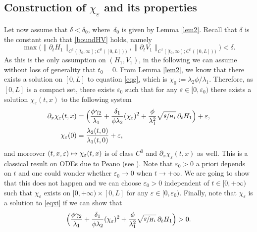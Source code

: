 \documentclass[JEP,XML,SOM,Unicode]{cedram}
\newcommand\mto{\mathchoice{\longmapsto}{\mapsto}{\mapsto}{\mapsto}}
\theoremstyle{definition}
\begin{document}
\subsection{Construction of $\chi_{\varepsilon}$ and its properties}
Let now assume that $\delta \!<\!\delta_{0}$, where~$\delta_{0}$ is given by Lemma \ref{lem2}. {Recall that $\delta$ is the constant such that \eqref{boundHV} holds, namely
\begin{equation*}
\max\bigl(\lVert\partial_{t}H_{1}\rVert_{C^{1}([t_{0},\infty);{C^{0}([0,L])})},\lVert\partial_{t}V_{1}\rVert_{C^{1}([t_{0},\infty);{C^{0}([0,L])})}\bigr)<\delta.
\end{equation*}
As this is the only assumption on $(H_{1},V_{1})$, in the following we can assume without loss of generality that $t_{0}=0$.}
From Lemma \ref{lem2}, we know that there exists a solution on $[0,L]$ to equation \eqref{eqg}, which is ${\chi_{0}:=}\lambda_{2}\phi/\lambda_{1}$.
Therefore, as $[0,L]$ is a compact set, there exists $\varepsilon_{{0}}$ such that
for any $\varepsilon\in[0,\varepsilon_{{0}})$ there exists a solution $\chi_{\varepsilon}(t,x)$ to the following system
\begin{equation}
\begin{split}
\partial_{x}\chi_{\varepsilon}(t,x)&=\Bigl(\frac{\phi\gamma_{2}}{\lambda_{1}}+\frac{\delta_{1}}{\phi\lambda_{2}}(\chi_{\varepsilon})^{2}+{\frac{\phi}{\lambda_{1}^{2}}}\sqrt{\sfrac{g}{H_{1}}}\,\partial_{t} H_{1} \Bigr)+\varepsilon,\\
\chi_{\varepsilon}(0)&=\frac{\lambda_{2}(t,0)}{\lambda_{1}(t,0)}+\varepsilon,
\end{split}
\label{eqf}
\end{equation}
and moreover $(t,x,\varepsilon)\mto \chi_{\varepsilon}(t,x)$ is of class $C^{0}$ and $\partial_{x}\chi_{\varepsilon}(t,x)$ as well.
This is a classical result on {ODEs} due to Peano (see \eg \cite[Chap.\,5, Th.\,3.1]{Hartman}). Note that $\varepsilon_{0}>0$ a priori depends on $t$ and one could wonder whether $\varepsilon_{0}\to 0$ when $t\to+\infty$. We are going to show that this does not happen and we can choose $\varepsilon_{0}>0$ independent of $t\in[0,+\infty)$ such that $\chi_{\varepsilon}$ exists on $[0,+\infty)\times[0,L]$ for any $\varepsilon\in[0,\varepsilon_{0})$. Finally, note that $\chi_{\varepsilon}$ is a solution to \eqref{eqxi} if we can show that
\begin{equation*}
\Bigl(\frac{\phi\gamma_{2}}{\lambda_{1}}+\frac{\delta_{1}}{\phi\lambda_{2}}(\chi_{\varepsilon})^{2}+{\frac{\phi}{\lambda_{1}^{2}}}\sqrt{\sfrac{g}{H_{1}}}\,\partial_{t} H_{1} \Bigr)>0.
\end{equation*}
\end{document}
